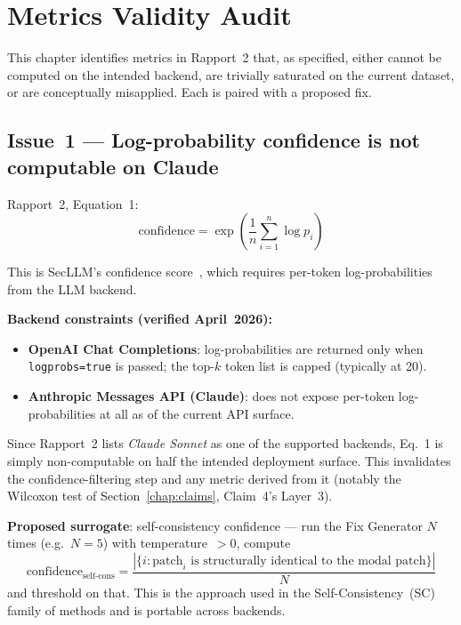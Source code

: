 \documentclass[11pt, a4paper]{report}
\begin{document}
\chapter{Metrics Validity Audit}
\label{chap:metrics_audit}
\label{sec:metrics_audit}

This chapter identifies metrics in Rapport~2 that, as specified, either
cannot be computed on the intended backend, are trivially saturated on the
current dataset, or are conceptually misapplied. Each is paired with a
proposed fix.

\section{Issue~1 --- Log-probability confidence is not computable on Claude}

Rapport~2, Equation~1:
\[
  \text{confidence} = \exp\!\left(\frac{1}{n}\sum_{i=1}^{n} \log p_i\right)
\]

This is SecLLM's confidence score~\citep{devito2025secllm}, which requires
per-token log-probabilities from the LLM backend.

\textbf{Backend constraints (verified April~2026):}

\begin{itemize}
  \item \textbf{OpenAI Chat Completions}: log-probabilities are returned
        only when \texttt{logprobs=true} is passed; the top-$k$ token
        list is capped (typically at 20).
  \item \textbf{Anthropic Messages API (Claude)}: does not expose
        per-token log-probabilities at all as of the current API
        surface.
\end{itemize}

Since Rapport~2 lists \emph{Claude Sonnet} as one of the supported
backends, Eq.~1 is simply non-computable on half the intended
deployment surface. This invalidates the confidence-filtering step
and any metric derived from it (notably the Wilcoxon test of
Section~\ref{chap:claims}, Claim~4's Layer~3).

\textbf{Proposed surrogate}: self-consistency confidence --- run the
Fix Generator $N$ times (e.g.\ $N=5$) with temperature~$>0$, compute
\[
  \text{confidence}_{\text{self-cons}} =
    \frac{|\{i : \text{patch}_i \text{ is structurally identical to the modal patch}\}|}{N}
\]
and threshold on that. This is the approach used in the
Self-Consistency~(SC) family of methods and is portable across
backends.
\end{document}
